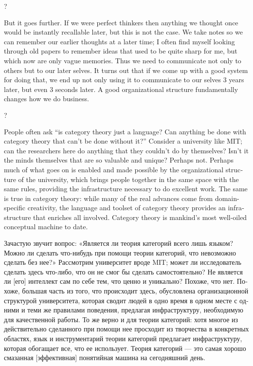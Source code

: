 \documentclass[a4paper]{book}
\theoremstyle{myth}
\begin{document}
\begin{english}
\begin{russian}? \end{russian}

But it goes further. If we were perfect thinkers then anything we thought once would be instantly recallable later, but this is not the case. We take notes so we can remember our earlier thoughts at a later time; I often find myself looking through old papers to remember ideas that used to be quite sharp for me, but which now are only vague memories. Thus we need to communicate not only to others but to our later selves. It turns out that if we come up with a good system for doing that, we end up not only using it to communicate to our selves 3 years later, but even 3 seconds later. A good organizational structure fundamentally changes how we do business.

\begin{russian}? \end{russian}

People often ask “is category theory just a language? Can anything be done with category theory that can't be done without it?” Consider a university like MIT; can the researchers here do anything that they couldn't do by themselves? Isn't it the minds themselves that are so valuable and unique? Perhaps not. Perhaps much of what goes on is enabled and made possible by the organizational structure of the university, which brings people together in the same space with the same rules, providing the  infrastructure necessary to do excellent work. The same is true in category theory: while many of the real advances come from domain-specific creativity, the language and toolset of category theory provides an infrastructure that enriches all involved. Category theory is mankind's most well-oiled conceptual machine to date.

\begin{russian}Зачастую звучит вопрос: «Является ли теория категорий всего лишь языком? Можно ли сделать что-нибудь при помощи теории категорий, что невозможно сделать без нее?» Рассмотрим университет вроде MIT; может ли исследователь сделать здесь что-либо, что он не смог бы сделать самостоятельно? Не является ли [его] интеллект сам по себе тем, что ценно и уникально? Похоже, что нет. Похоже, большая часть из того, что происходит здесь, обусловлена организационной структурой университета, которая сводит людей в одно время в одном месте с одними и теми же правилами поведения, предлагая инфраструктуру, необходимую для качественной работы. То же верно и для теории категорий: хотя многое из действительно сделанного при помощи нее просходит из творчества в конкретных областях, язык и инструментарий теории категорий предлагает инфраструктуру, которая обогащает все, что ее использует. Теория категорий — это самая хорошо смазанная [эффективная] понятийная машина на сегодняшний день. \end{russian}


\end{english}
\end{document}

